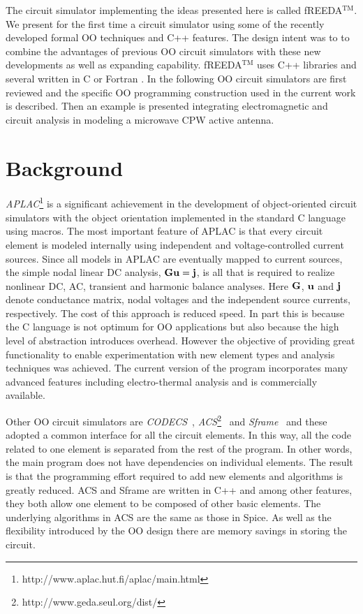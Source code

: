 The circuit simulator implementing the ideas presented here is called
fREEDA$^{\mathrm{TM}}$. We present for the first time a circuit simulator using some
of the recently developed formal OO techniques and C++ features. The
design intent was to to combine the advantages of previous OO circuit
simulators with these new developments as well as expanding
capability. fREEDA$^{\mathrm{TM}}$ uses C++ libraries \cite{adol-c:96,mv++} and
several written in C or Fortran \cite{FFTW,Sparse,NNES}.  In the
following OO circuit simulators are first reviewed and the specific OO
programming construction used in the current work is described.  Then
an example is presented integrating electromagnetic and circuit
analysis in modeling a microwave CPW active antenna.


\section{Background}

\emph{APLAC}\footnote{http://www.aplac.hut.fi/aplac/main.html}
\cite{aplac1,aplac2} is a significant achievement in the development
of object-oriented circuit simulators with the object orientation
implemented in the standard C language using macros. The most
important feature of APLAC is that every circuit element is modeled
internally using independent and voltage-controlled current
sources. Since all models in APLAC are eventually mapped to current
sources, the simple nodal linear DC analysis, ${\bf G u} = {\bf j}$,
is all that is required to realize nonlinear DC, AC, transient and
harmonic balance analyses. Here ${\bf G}$, ${\bf u}$ and ${\bf j}$
denote conductance matrix, nodal voltages and the independent source
currents, respectively.  The cost of this approach is reduced
speed. In part this is because the C language is not optimum for OO
applications but also because the high level of abstraction introduces
overhead. However the objective of providing great functionality to
enable experimentation with new element types and analysis techniques
was achieved.  The current version of the program incorporates many
advanced features including electro-thermal analysis and is
commercially available.

Other OO circuit simulators are \emph{CODECS}~\cite{codecs},
\emph{ACS}\footnote{http://www.geda.seul.org/dist/}~\cite{davis1} and
\emph{Sframe}~\cite{feldmann} and these adopted a common interface for
all the circuit elements. In this way, all the code related to one
element is separated from the rest of the program. In other words, the
main program does not have dependencies on individual elements.  The
result is that the programming effort required to add new elements and
algorithms is greatly reduced.  ACS and Sframe are written in C++ and
among other features, they both allow one element to be composed of
other basic elements.  The underlying algorithms in ACS are the same
as those in Spice. As well as the flexibility introduced by the OO
design there are memory savings in storing the circuit.

